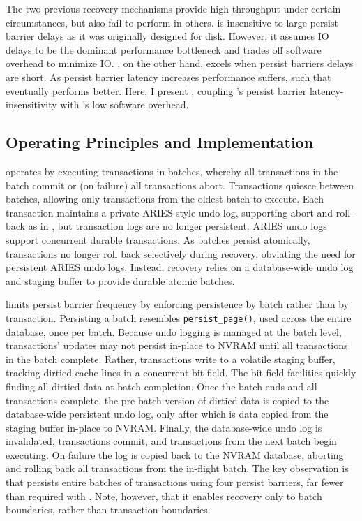 The two previous recovery mechanisms provide high throughput under certain circumstances, but also fail to perform in others.
\NVDisk is insensitive to large persist barrier delays as it was originally designed for disk.
However, it assumes IO delays to be the dominant performance bottleneck and trades off software overhead to minimize IO.
\InPlace, on the other hand, excels when persist barriers delays are short.
As persist barrier latency increases performance suffers, such that \NVDisk eventually performs better.
Here, I present \GroupCommit, coupling \NVDisk's persist barrier latency-insensitivity with \InPlace's low software overhead.

\subsection{Operating Principles and Implementation}
\label{sec:OLTP_design:GroupCommit:Proposed}

\GroupCommit operates by executing transactions in batches, whereby all transactions in the batch commit or (on failure) all transactions abort.
Transactions quiesce between batches, allowing only transactions from the oldest batch to execute.
Each transaction maintains a private ARIES-style undo log, supporting abort and roll-back as in \InPlace, but transaction logs are no longer persistent.
ARIES undo logs support concurrent durable transactions.
As batches persist atomically, transactions no longer roll back selectively during recovery, obviating the need for persistent ARIES undo logs.
Instead, recovery relies on a database-wide undo log and staging buffer to provide durable atomic batches.

\GroupCommit limits persist barrier frequen\-cy by enforcing persistence by batch rather than by transaction.
Persisting a batch resembles \texttt{persist\_page()}, used across the entire database, once per batch.
Because undo logging is managed at the batch level, transactions' updates may not persist in-place to NVRAM until all transactions in the batch complete.
Rather, transactions write to a volatile staging buffer, tracking dirtied cache lines in a concurrent bit field.
The bit field facilities quickly finding all dirtied data at batch completion.
Once the batch ends and all transactions complete, the pre-batch version of dirtied data is copied to the database-wide persistent undo log, only after which is data copied from the staging buffer in-place to NVRAM.
Finally, the database-wide undo log is invalidated, transactions commit, and transactions from the next batch begin executing.
On failure the log is copied back to the NVRAM database, aborting and rolling back all transactions from the in-flight batch.
The key observation is that \GroupCommit persists entire batches of transactions using four persist barriers, far fewer than required with \InPlace.  Note, however, that it enables recovery only to batch boundaries, rather than transaction boundaries.

